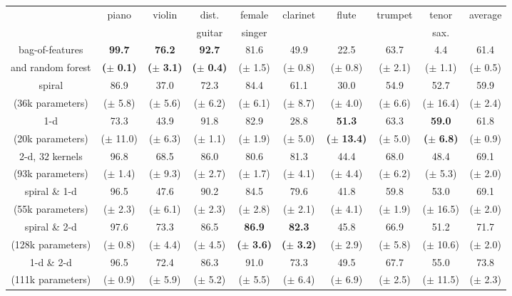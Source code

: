 \documentclass{article}
\newcommand*{\s}[1]{\small{($\pm$ #1)}}
\newcommand*{\g}[1]{\small{\textbf{(}$\boldsymbol{\pm}$ \textbf{#1}\textbf{)}}}
\begin{document}
\begin{table}[t]
    \begin{center}
    \setlength{\unitlength}{1cm}
    \begin{tabular}{|c|cccccccc|c|}
        \hline
        & piano & violin & dist.    & female & clarinet & flute & trumpet & tenor & average \\
        &           &          & guitar & singer   &           &          &              &  sax.  &                \\
        \hline
        bag-of-features
        & \textbf{99.7} & \textbf{76.2} & \textbf{92.7} & 81.6 & 49.9 & 22.5 & 63.7 & \hphantom{0}4.4 & 61.4 \\
        and random forest
        &\g{0.1}&\g{3.1}&\g{0.4}&\s{1.5}&\s{0.8}&\s{0.8}&\s{2.1}&\s{1.1} & \s{0.5}\\
        \hline
        spiral
        & 86.9 & 37.0 & 72.3 & 84.4 & 61.1 & 30.0 & 54.9 & 52.7 & 59.9 \\
        (36k parameters)
        &\s{5.8}&\s{5.6}&\s{6.2}&\s{6.1}&\s{8.7}&\s{4.0}&\s{6.6}&\s{16.4}&\s{2.4}\\
        \hline
        1-d
        & 73.3 & 43.9 & 91.8 & 82.9 & 28.8 & \textbf{51.3} & 63.3 & \textbf{59.0} & 61.8 \\
        (20k parameters)
        &\s{11.0}&\s{6.3}&\s{1.1}&\s{1.9}&\s{5.0}&\g{13.4}&\s{5.0}&\g{6.8}&\s{0.9} \\
        \hline
        2-d, $32$ kernels
        & 96.8 & 68.5 & 86.0 & 80.6 & 81.3 & 44.4 & 68.0 & 48.4 & 69.1 \\
        (93k parameters)
        &\s{1.4}&\s{9.3}&\s{2.7}&\s{1.7}&\s{4.1}&\s{4.4}&\s{6.2}&\s{5.3}&\s{2.0} \\
        \hline
        spiral \& 1-d
        & 96.5 & 47.6 & 90.2 & 84.5 & 79.6 & 41.8 & 59.8 & 53.0 & 69.1 \\
        (55k parameters)
        &\s{2.3}&\s{6.1}&\s{2.3}&\s{2.8}&\s{2.1}&\s{4.1}&\s{1.9}&\s{16.5}&\s{2.0}\\
        \hline
        spiral \& 2-d
        & 97.6 & 73.3 & 86.5 & \textbf{86.9} & \textbf{82.3} & 45.8 & 66.9 & 51.2 & 71.7\\
        (128k parameters)
        &\s{0.8}&\s{4.4}&\s{4.5}&\g{3.6}&\g{3.2}&\s{2.9}&\s{5.8}&\s{10.6}&\s{2.0}\\
        \hline
        1-d \& 2-d
        & 96.5 & 72.4 & 86.3 & 91.0 & 73.3 & 49.5 & 67.7 & 55.0 & 73.8 \\
        (111k parameters)
        &\s{0.9}&\s{5.9}&\s{5.2}&\s{5.5}&\s{6.4}&\s{6.9}&\s{2.5}&\s{11.5}&\s{2.3}\\

\end{tabular}
\end{center}
\end{table}
\end{document}
